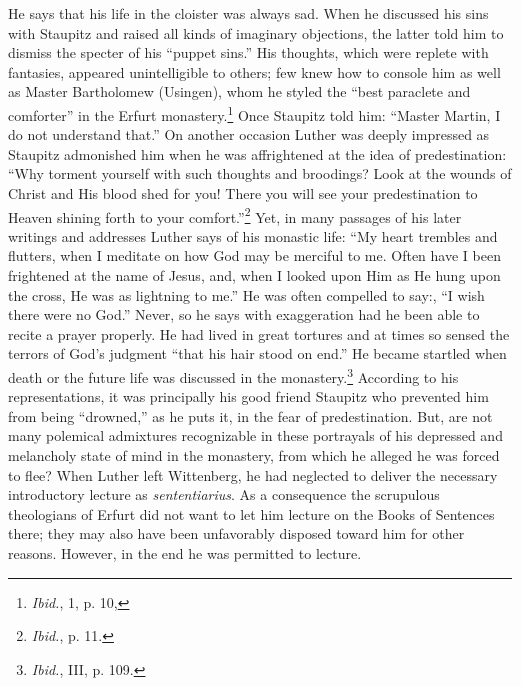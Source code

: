 He says that his life in the cloister was always sad. When he
discussed his sins with Staupitz and raised all kinds of imaginary objections,
the latter told him to dismiss the specter of his “puppet
sins.” His thoughts, which were replete with fantasies, appeared
unintelligible to others; few knew how to console him as well as
Master Bartholomew (Usingen), whom he styled the “best paraclete
and comforter” in the Erfurt monastery.\footnote{\textit{Ibid.}, 1, p. 10,}
Once Staupitz told him:
“Master Martin, I do not understand that.” On another occasion
Luther was deeply impressed as Staupitz admonished him when
he was affrightened at the idea of predestination: “Why torment
yourself with such thoughts and broodings? Look at the wounds of
Christ and His blood shed for you! There you will see your predestination
to Heaven shining forth to your comfort.”\footnote{\textit{Ibid.}, p. 11.}
Yet, in many
passages of his later writings and addresses Luther says of his monastic
life: “My heart trembles and flutters, when I meditate on how
God may be merciful to me. Often have I been frightened at the
name of Jesus, and, when I looked upon Him as He hung upon the
cross, He was as lightning to me.” He was often compelled to say:,
``I wish there were no God.'' Never, so he says with exaggeration
had he been able to recite a prayer properly. He had lived in great
tortures and at times so sensed the terrors of God’s judgment “that
his hair stood on end.” He became startled when death or the future
life was discussed in the monastery.\footnote{\textit{Ibid.}, III, p. 109.}
According to his representations,
it was principally his good friend Staupitz who prevented him
from being “drowned,” as he puts it, in the fear of predestination.
But, are not many polemical admixtures recognizable in these
portrayals of his depressed and melancholy state of mind in
the monastery, from which he alleged he was forced to flee?
When Luther left Wittenberg, he had neglected to deliver the
necessary introductory lecture as \textit{sententiarius}. As a consequence
the scrupulous theologians of Erfurt did not want to let him lecture
on the Books of Sentences there; they may also have been unfavorably
disposed toward him for other reasons. However, in the end he
was permitted to lecture.

